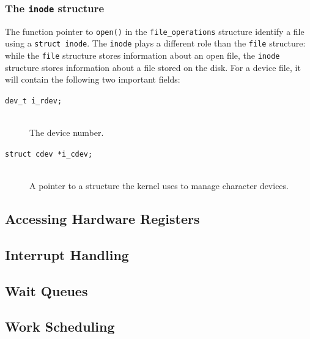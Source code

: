 \subsubsection{The \texttt{inode} structure}
The function pointer to \texttt{open()} in the \texttt{file\_operations} structure identify a file using a \texttt{struct inode}. The \texttt{inode} plays a different role than the \texttt{file} structure: while the \texttt{file} structure stores information about an open file, the \texttt{inode} structure stores information about a file stored on the disk. For a device file, it will contain the following two important fields:
\begin{description}
  \item[\texttt{dev\_t i\_rdev;}] \hfill \\
    The device number.
  \item[\texttt{struct cdev *i\_cdev;}] \hfill \\
    A pointer to a structure the kernel uses to manage character devices.
\end{description}


\subsection{Accessing Hardware Registers}\label{sec:accessing-hardware-registers}


\subsection{Interrupt Handling}\label{sec:interrupt-handling}


\subsection{Wait Queues}\label{sec:wait-queues}


\subsection{Work Scheduling}\label{sec:work-scheduling}


